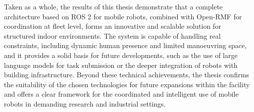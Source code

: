 Taken as a whole, the results of this thesis demonstrate that a complete architecture based on ROS 2 for mobile robots, combined with Open-RMF for coordination at fleet level, forms an innovative and scalable solution for structured indoor environments. The system is capable of handling real constraints, including dynamic human presence and limited manoeuvring space, and it provides a solid basis for future developments, such as the use of large language models for task submission or the deeper integration of robots with building infrastructure. Beyond these technical achievements, the thesis confirms the suitability of the chosen technologies for future expansions within the facility and offers a clear framework for the coordinated and intelligent use of mobile robots in demanding research and industrial settings.


